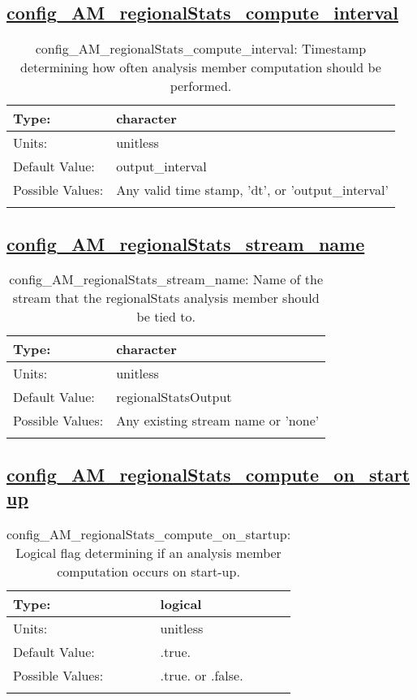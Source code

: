 \subsection[config\_AM\_regionalStats\_compute\_interval]{\hyperref[sec:nm_tab_AM_regionalStats]{config\_AM\_regionalStats\_compute\_interval}}
\label{subsec:nm_sec_config_AM_regionalStats_compute_interval}
\begin{center}
\begin{longtable}{| p{2.0in} || p{4.0in} |}
    \hline
    Type: & character \\
    \hline
    Units: & \si{unitless} \\
    \hline
    Default Value: & output\_interval \\
    \hline
    Possible Values: & Any valid time stamp, 'dt', or 'output\_interval' \\
    \hline
    \caption{config\_AM\_regionalStats\_compute\_interval: Timestamp determining how often analysis member computation should be performed.}
\end{longtable}
\end{center}
\subsection[config\_AM\_regionalStats\_stream\_name]{\hyperref[sec:nm_tab_AM_regionalStats]{config\_AM\_regionalStats\_stream\_name}}
\label{subsec:nm_sec_config_AM_regionalStats_stream_name}
\begin{center}
\begin{longtable}{| p{2.0in} || p{4.0in} |}
    \hline
    Type: & character \\
    \hline
    Units: & \si{unitless} \\
    \hline
    Default Value: & regionalStatsOutput \\
    \hline
    Possible Values: & Any existing stream name or 'none' \\
    \hline
    \caption{config\_AM\_regionalStats\_stream\_name: Name of the stream that the regionalStats analysis member should be tied to.}
\end{longtable}
\end{center}
\subsection[config\_AM\_regionalStats\_compute\_on\_startup]{\hyperref[sec:nm_tab_AM_regionalStats]{config\_AM\_regionalStats\_compute\_on\_startup}}
\label{subsec:nm_sec_config_AM_regionalStats_compute_on_startup}
\begin{center}
\begin{longtable}{| p{2.0in} || p{4.0in} |}
    \hline
    Type: & logical \\
    \hline
    Units: & \si{unitless} \\
    \hline
    Default Value: & .true. \\
    \hline
    Possible Values: & .true. or .false. \\
    \hline
    \caption{config\_AM\_regionalStats\_compute\_on\_startup: Logical flag determining if an analysis member computation occurs on start-up.}
\end{longtable}
\end{center}
